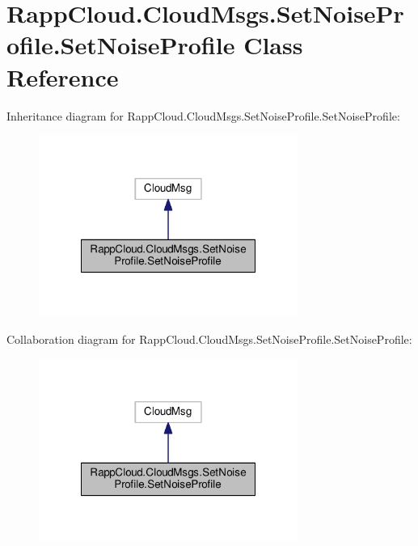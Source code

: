 \hypertarget{classRappCloud_1_1CloudMsgs_1_1SetNoiseProfile_1_1SetNoiseProfile}{\section{Rapp\-Cloud.\-Cloud\-Msgs.\-Set\-Noise\-Profile.\-Set\-Noise\-Profile Class Reference}
\label{classRappCloud_1_1CloudMsgs_1_1SetNoiseProfile_1_1SetNoiseProfile}
}


Inheritance diagram for Rapp\-Cloud.\-Cloud\-Msgs.\-Set\-Noise\-Profile.\-Set\-Noise\-Profile\-:
\nopagebreak
\begin{figure}[H]
\begin{center}
\leavevmode
\includegraphics[width=240pt]{classRappCloud_1_1CloudMsgs_1_1SetNoiseProfile_1_1SetNoiseProfile__inherit__graph}
\end{center}
\end{figure}


Collaboration diagram for Rapp\-Cloud.\-Cloud\-Msgs.\-Set\-Noise\-Profile.\-Set\-Noise\-Profile\-:
\nopagebreak
\begin{figure}[H]
\begin{center}
\leavevmode
\includegraphics[width=240pt]{classRappCloud_1_1CloudMsgs_1_1SetNoiseProfile_1_1SetNoiseProfile__coll__graph}
\end{center}
\end{figure}
